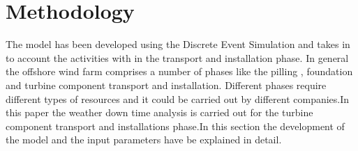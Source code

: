 \section{Methodology}
The model has been developed using the Discrete Event Simulation and takes in to account the activities with in the transport and installation phase. In general the offshore wind farm comprises a number of phases like the pilling , foundation and turbine component transport and installation. Different phases require different types of resources and it could be carried out by different companies.In this paper the weather down time analysis is carried out for the turbine component transport and installations phase.In this section the development of the model and the input  parameters have be explained in detail.